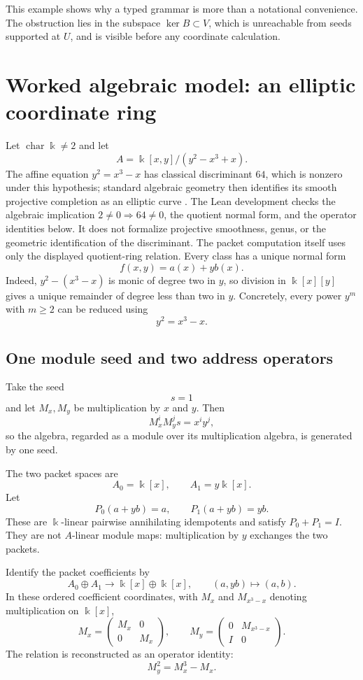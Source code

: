 \documentclass[11pt]{article}
\theoremstyle{definition}
\theoremstyle{remark}
\theoremstyle{definition}\newtheorem{example}[theorem]{Example}
\newcommand{\bbk}{\Bbbk}
\begin{document}
This example shows why a typed grammar is more than a notational convenience. The obstruction lies in the subspace $\ker B\subset V$, which is unreachable from seeds supported at $U$, and is visible before any coordinate calculation.

\section{Worked algebraic model: an elliptic coordinate ring}

Let $\operatorname{char}\bbk\ne2$ and let
\[
A=\bbk[x,y]/(y^2-x^3+x).
\]
The affine equation $y^2=x^3-x$ has classical discriminant $64$, which is nonzero under this hypothesis; standard algebraic geometry then identifies its smooth projective completion as an elliptic curve \cite{silverman2009}. The Lean development checks the algebraic implication $2\ne0\Rightarrow64\ne0$, the quotient normal form, and the operator identities below. It does not formalize projective smoothness, genus, or the geometric identification of the discriminant. The packet computation itself uses only the displayed quotient-ring relation.
Every class has a unique normal form
\[
f(x,y)=a(x)+y b(x).
\]
Indeed, $y^2-(x^3-x)$ is monic of degree two in $y$, so division in $\bbk[x][y]$ gives a unique remainder of degree less than two in $y$. Concretely, every power $y^m$ with $m\ge2$ can be reduced using
\[
y^2=x^3-x.
\]

\subsection{One module seed and two address operators}

Take the seed
\[
s=1
\]
and let $M_x,M_y$ be multiplication by $x$ and $y$. Then
\[
M_x^iM_y^js=x^iy^j,
\]
so the algebra, regarded as a module over its multiplication algebra, is generated by one seed.

The two packet spaces are
\[
A_0=\bbk[x],
\qquad
A_1=y\bbk[x].
\]
Let
\[
P_0(a+yb)=a,
\qquad
P_1(a+yb)=yb.
\]
These are $\bbk$-linear pairwise annihilating idempotents and satisfy $P_0+P_1=I$. They are not $A$-linear module maps: multiplication by $y$ exchanges the two packets.

Identify the packet coefficients by
\[
A_0\oplus A_1\longrightarrow\bbk[x]\oplus\bbk[x],
\qquad
(a,yb)\longmapsto(a,b).
\]
In these ordered coefficient coordinates, with $M_x$ and $M_{x^3-x}$ denoting multiplication on $\bbk[x]$,
\[
{
M_x=
\begin{pmatrix}
M_x&0\\
0&M_x
\end{pmatrix},
\qquad
M_y=
\begin{pmatrix}
0&M_{x^3-x}\\
I&0
\end{pmatrix}.
}
\]
The relation is reconstructed as an operator identity:
\[
M_y^2=M_x^3-M_x.
\]
\end{document}
